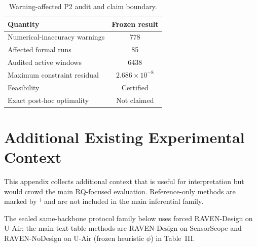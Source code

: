 \begin{table}[!t]
\centering
\caption{Warning-affected P2 audit and claim boundary.}
\label{tab:app_p2_warning_audit}
\footnotesize
\setlength{\tabcolsep}{5pt}
\begin{tabular*}{\columnwidth}{@{\extracolsep{\fill}}lc}
\toprule
Quantity & Frozen result\\
\midrule
Numerical-inaccuracy warnings & 778\\
Affected formal runs & 85\\
Audited active windows & 6438\\
Maximum constraint residual & $2.686\times10^{-8}$\\
Feasibility & Certified\\
Exact post-hoc optimality & Not claimed\\
\bottomrule
\end{tabular*}
\end{table}


\FloatBarrier

\section{Additional Existing Experimental Context}
\label{app:additional_context}

This appendix collects additional context that is useful for interpretation but
would crowd the main RQ-focused evaluation.  Reference-only methods are marked
by $^\dagger$ and are not included in the main inferential family.

The sealed same-backbone protocol family below uses forced RAVEN-Design on U-Air;
the main-text table methods are RAVEN-Design on SensorScope and
RAVEN-NoDesign on U-Air
(frozen heuristic $\phi$) in Table~III.

